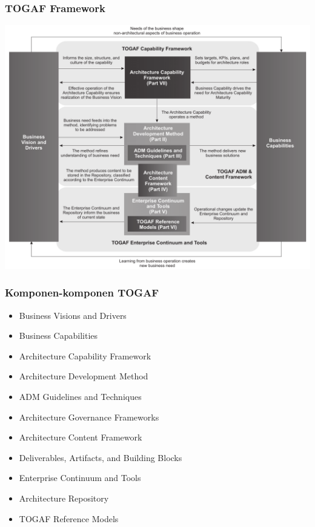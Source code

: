 \documentclass[aspectratio=169]{beamer}
\begin{document}
	{
		\begin{frame}
			\frametitle{TOGAF Framework}
			\begin{center}
				\includegraphics[width=.70\textwidth]{../figures/togaf}
			\end{center}
		\end{frame}
	}
	
	\begin{frame}
		\frametitle{Komponen-komponen TOGAF}
		\begin{itemize}
			\item Business Visions and Drivers
			\item Business Capabilities
			\item Architecture Capability Framework
			\item Architecture Development Method
			\item ADM Guidelines and Techniques
			\item Architecture Governance Frameworks
			\item Architecture Content Framework
			\item Deliverables, Artifacts, and Building Blocks
			\item Enterprise Continuum and Tools
			\item Architecture Repository
			\item TOGAF Reference Models
		\end{itemize}
	\end{frame}
	
\end{document}
